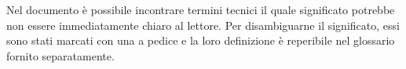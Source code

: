 Nel documento è possibile incontrare termini tecnici il quale significato potrebbe non essere immediatamente chiaro al lettore. Per disambiguarne il significato, essi sono stati marcati con una  a pedice e la loro definizione è reperibile nel glossario fornito separatamente.